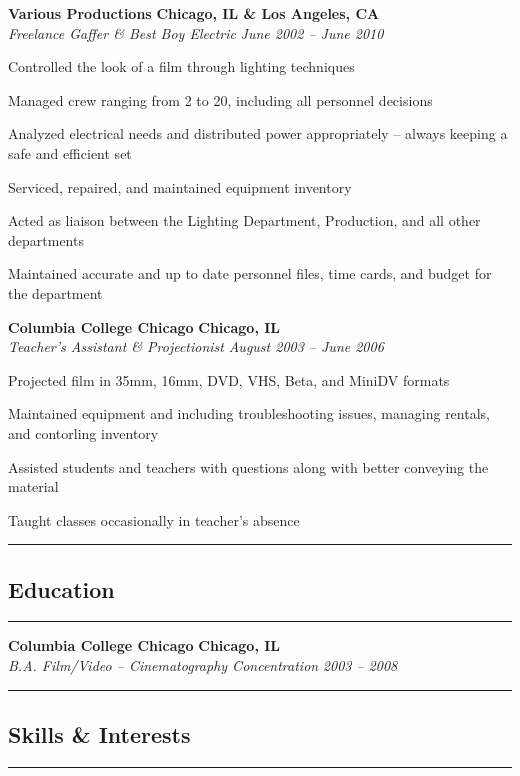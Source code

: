 \documentclass[10pt,letterpaper]{article}			%
\newcommand{\JobHeader}[4]{							%
			\vspace{-.4em}
			\textbf{#1}
			\hfill
			\textbf{#2}
			\\
			\emph{#3}
			\hfill
			\emph{#4}\par
			\vspace{-1em}
			}
\begin{document}
	\JobHeader{Various Productions}{Chicago, IL \& Los Angeles, CA}{Freelance Gaffer \& Best Boy Electric}{June 2002 -- June 2010}
		\begin{itemize*}
		\item Controlled the look of a film through lighting techniques 
		\item Managed crew ranging from 2 to 20, including all personnel decisions
		\item Analyzed electrical needs and distributed power appropriately -- always keeping a safe and efficient set
		\item Serviced, repaired, and maintained equipment inventory
		\item Acted as liaison between the Lighting Department, Production, and all other departments
		\item Maintained accurate and up to date personnel files, time cards, and budget for the department
		\end{itemize*}

	\JobHeader{Columbia College Chicago}{Chicago, IL}{Teacher's Assistant \& Projectionist}{August 2003 -- June 2006}
		\begin{itemize*}
		\item Projected film in 35mm, 16mm, DVD, VHS, Beta, and MiniDV formats 
		\item Maintained equipment and including troubleshooting issues, managing rentals, and contorling inventory
		\item Assisted students and teachers with questions along with better conveying the material
		\item Taught classes occasionally in teacher's absence
		\end{itemize*}
		
\hrule
\vspace{-1.4em}
\subsection*{Education}
\vspace{-.6em}
\hrule
\vspace{.8em}

	\JobHeader{Columbia College Chicago}{Chicago, IL}{B.A. Film/Video -- Cinematography Concentration}{2003 -- 2008}

\vspace{1em}
\hrule
\vspace{-1.4em}
\subsection*{Skills \& Interests}
\vspace{-0.6em}
\hrule
\vspace{.4em}
\end{document}
